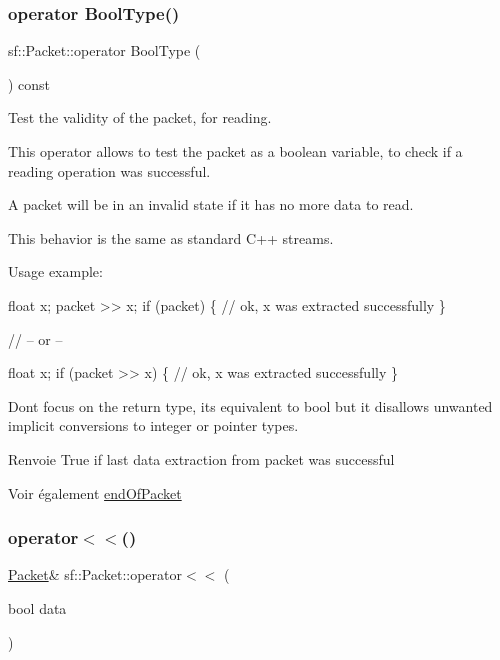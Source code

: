 \subsubsection{\texorpdfstring{operator Bool\+Type()}{operator BoolType()}}
{\footnotesize\ttfamily sf\+::\+Packet\+::operator Bool\+Type (\begin{DoxyParamCaption}{ }\end{DoxyParamCaption}) const}



Test the validity of the packet, for reading. 

This operator allows to test the packet as a boolean variable, to check if a reading operation was successful.

A packet will be in an invalid state if it has no more data to read.

This behavior is the same as standard C++ streams.

Usage example\+: 
\begin{DoxyCode}
\textcolor{keywordtype}{float} x;
packet >> x;
\textcolor{keywordflow}{if} (packet)
\{
   \textcolor{comment}{// ok, x was extracted successfully}
\}

\textcolor{comment}{// -- or --}

\textcolor{keywordtype}{float} x;
\textcolor{keywordflow}{if} (packet >> x)
\{
   \textcolor{comment}{// ok, x was extracted successfully}
\}
\end{DoxyCode}


Don\textquotesingle{}t focus on the return type, it\textquotesingle{}s equivalent to bool but it disallows unwanted implicit conversions to integer or pointer types.

\begin{DoxyReturn}{Renvoie}
True if last data extraction from packet was successful
\end{DoxyReturn}
\begin{DoxySeeAlso}{Voir également}
\hyperlink{classsf_1_1Packet_a61e354fa670da053907c14b738839560}{end\+Of\+Packet} 
\end{DoxySeeAlso}
\mbox{\label{classsf_1_1Packet_aa5a465ed02ba29d83ecdafb0ac3fff21}} 
\subsubsection{\texorpdfstring{operator$<$$<$()}{operator<<()}}
{\footnotesize\ttfamily \hyperlink{classsf_1_1Packet}{Packet}\& sf\+::\+Packet\+::operator$<$$<$ (\begin{DoxyParamCaption}\item[{bool}]{data }\end{DoxyParamCaption})}

